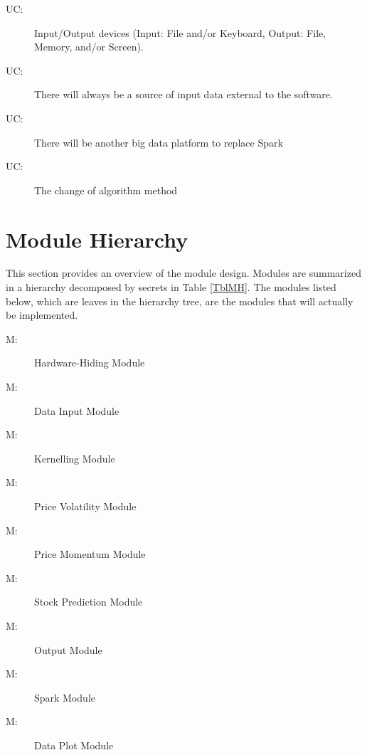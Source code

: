 \documentclass[12pt, titlepage]{article}
\newcounter{ucnum}
\newcommand{\uctheucnum}{UC\theucnum}
\newcounter{mnum}
\newcommand{\mthemnum}{M\themnum}
\begin{document}
\begin{description}
\item[ \uctheucnum \label{UC1}:] Input/Output devices
(Input: File and/or Keyboard, Output: File, Memory, and/or Screen).
\item[ \uctheucnum \label{UC2}:] There will always be
a source of input data external to the software.
\item[ \uctheucnum \label{UC3}:] There will be another big
  data platform to replace Spark
\item[ \uctheucnum \label{UC4}:] The change of algorithm method
\end{description}

\section{Module Hierarchy} \label{SecMH}

This section provides an overview of the module design. Modules are summarized
in a hierarchy decomposed by secrets in Table \ref{TblMH}. The modules listed
below, which are leaves in the hierarchy tree, are the modules that will
actually be implemented.

\begin{description}
\item [ \mthemnum \label{mHH}:] Hardware-Hiding Module
\item [ \mthemnum \label{mInput}:] Data Input Module
\item [ \mthemnum \label{mKernelling}:]Kernelling Module
\item [ \mthemnum \label{mVolatility}:] Price Volatility Module
\item [ \mthemnum \label{mMomentum}:] Price Momentum Module
\item [ \mthemnum \label{mPrediction}:] Stock Prediction Module
\item [ \mthemnum \label{mOutput}:] Output Module
\item [ \mthemnum \label{mSpark}:] Spark Module
\item [ \mthemnum \label{mPlot}:] Data Plot Module
\end{description}
\end{document}
